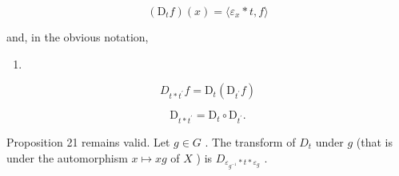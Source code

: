 \[
\left(\mathrm{D} _ {t} f\right) (x) = \langle \varepsilon_ {x} * t, f \rangle\tag{19}
\]

and, in the obvious notation,

\begin{enumerate}
\def\labelenumi{(\arabic{enumi})}
\setcounter{enumi}{19}
\tightlist
\item
\end{enumerate}

\[
D _ {t * t ^ {\prime}} f = \mathrm{D} _ {t} (\mathrm{D} _ {t ^ {\prime}} f)\tag{20}
\]

\[
\mathrm{D} _ {t * t ^ {\prime}} = \mathrm{D} _ {t} \circ \mathrm{D} _ {t ^ {\prime}}\tag{21}.
\]

Proposition 21 remains valid. Let \(g \in G\) . The transform of \(D_t\) under \(g\) (that is under the automorphism \(x \mapsto xg\) of \(X\) ) is \(D_{\varepsilon_{g^{-1}} * t * \varepsilon_g}\) .

